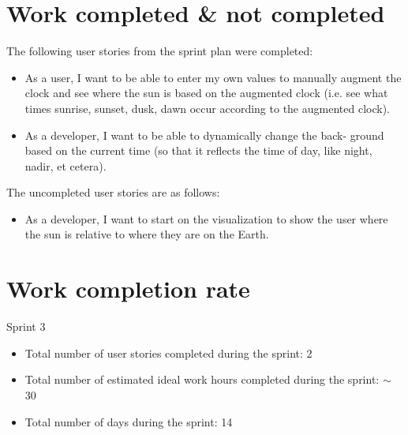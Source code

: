 \documentclass[11pt]{article}
\begin{document}
	\section{Work completed \& not completed}
		\vspace{-3mm}
		\normalsize{The following user stories from the sprint plan were completed:}\\
		\vspace{-3mm}
		\begin{itemize}
			\item As a user, I want to be able to enter my own values to manually augment the clock and see where the sun is based on the augmented clock (i.e. see what times sunrise, sunset, dusk, dawn occur according to the augmented clock).
			\item As a developer, I want to be able to dynamically change the back- ground based on the current time (so that it reflects the time of day, like night, nadir, et cetera).
		\end{itemize}
		\vspace{-3mm}
		\normalsize{The uncompleted user stories are as follows:}\\
		\vspace{-3mm}
		\begin{itemize}		
			\item As a developer, I want to start on the visualization to show the user where the sun is relative to where they are on the Earth.
		\end{itemize}
		\vspace{-3mm}
		
	\section{Work completion rate}
		\vspace{-3mm}
		\normalsize{Sprint 3}\\
		\vspace{-3mm}
		\begin{itemize}
			\item Total number of user stories completed during the sprint: 2
			\vspace{-3mm}
			\item Total number of estimated ideal work hours completed during the sprint: $\sim$ 30
			\vspace{-3mm}
			\item Total number of days during the sprint: 14
		\end{itemize}
	
\end{document}
